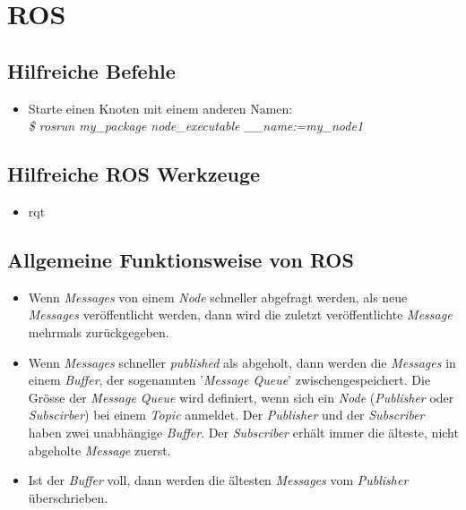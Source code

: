 \chapter{ROS}


\section{Hilfreiche Befehle}

\begin{itemize}
\item Starte einen Knoten mit einem anderen Namen: \\
\textit{\$ rosrun my\_package node\_executable \_\_name:=my\_node1}
\end{itemize}


\section{Hilfreiche ROS Werkzeuge}

\begin{itemize}
\item rqt
\end{itemize}


\section{Allgemeine Funktionsweise von ROS}

\begin{itemize}
\item Wenn \textit{Messages} von einem \textit{Node} schneller abgefragt werden, als neue \textit{Messages} veröffentlicht werden, dann wird die zuletzt veröffentlichte \textit{Message} mehrmals zurückgegeben.
\item Wenn \textit{Messages} schneller \textit{published} als abgeholt, dann werden die \textit{Messages} in einem \textit{Buffer}, der sogenannten '\textit{Message Queue}' zwischengespeichert. Die Grösse der \textit{Message Queue} wird definiert, wenn sich ein \textit{Node} (\textit{Publisher} oder \textit{Subscirber}) bei einem \textit{Topic} anmeldet. Der \textit{Publisher} und der \textit{Subscriber} haben zwei unabhängige \textit{Buffer}. Der \textit{Subscriber} erhält immer die älteste, nicht abgeholte \textit{Message} zuerst.
\item Ist der \textit{Buffer} voll, dann werden die ältesten \textit{Messages} vom \textit{Publisher} überschrieben.
\end{itemize}


